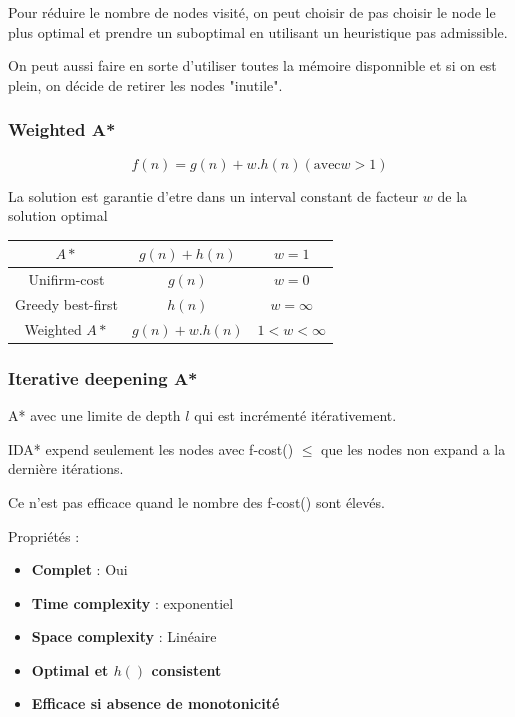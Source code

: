 			Pour réduire le nombre de nodes visité, on peut choisir de pas choisir le node le plus optimal et prendre un suboptimal en utilisant un heuristique pas admissible.
			
			On peut aussi faire en sorte d'utiliser toutes la mémoire disponnible et si on est plein, on décide de retirer les nodes "inutile".
			
		\subsubsection{Weighted A*}
			
			\begin{equation}
				f(n) = g(n) + w.h(n) (\text{avec} w>1)
			\end{equation}
			
			La solution est garantie d'etre dans un interval constant de facteur $w$ de la solution optimal
			
			\begin{center}
			\begin{tabular}{|c|c|c|}
				\hline
				$A*$ & $g(n) + h(n)$ & $w=1$\\ \hline
				Unifirm-cost & $g(n)$ & $w=0$ \\ \hline
				Greedy best-first & $h(n)$ & $w=\infty$ \\ \hline
				Weighted $A*$ & $g(n)+w.h(n)$ & $1<w<\infty$\\ \hline
			\end{tabular}
			\end{center}
			
		\subsubsection{Iterative deepening A*}
			A* avec une limite de depth $l$ qui est incrémenté itérativement.
			
			IDA* expend seulement les nodes avec f-cost() $\leq$ que les nodes non expand a la dernière itérations.
		
			Ce n'est pas efficace quand le nombre des f-cost() sont élevés.
			
			Propriétés :
			\begin{itemize}
				\item \textbf{Complet} : Oui
				\item \textbf{Time complexity} : exponentiel
				\item \textbf{Space complexity} : Linéaire
				\item \textbf{Optimal et $h()$ consistent}
				\item \textbf{Efficace si absence de monotonicité}
			\end{itemize}
			

